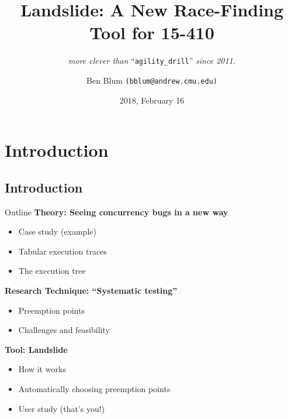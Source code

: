 \documentclass[xcolor=dvipsnames]{beamer}
\title[Landslide]{{\bf Landslide: A New Race-Finding Tool for 15-410}}
\subtitle[]{ {\em more clever than } ``\texttt{agility\_drill}'' {\em since 2011.}}
\author[Ben Blum]{Ben Blum \texttt{(bblum@andrew.cmu.edu)}}
\institute[CMU 15-410]{Carnegie Mellon University - 15-410}
\date[]{2018, February 16}
\begin{document}
\renewcommand{\inserttotalframenumber}{39}
\normalem
\begin{frame}
	\titlepage
\end{frame}


\newcommand\linegap{\vspace{0.2in}}
\newcommand\breakslide[1]{\begin{frame}{} \begin{center} #1 \end{center} \end{frame}}

\section{Introduction}
\subsection{Introduction}

\begin{frame}{Outline}
	\textbf{Theory: Seeing concurrency bugs in a new way}
	\begin{itemize}
		\item Case study (example)
		\item Tabular execution traces
		\item The execution tree
	\end{itemize}
	{\bf Research Technique: ``Systematic testing''}
	\begin{itemize}
		\item Preemption points
		\item Challenges and feasibility
	\end{itemize}
	{\bf Tool: Landslide}
	\begin{itemize}
		\item How it works
		\item Automatically choosing preemption points
		\item User study (that's you!)
	\end{itemize}
\end{frame}
\end{document}
